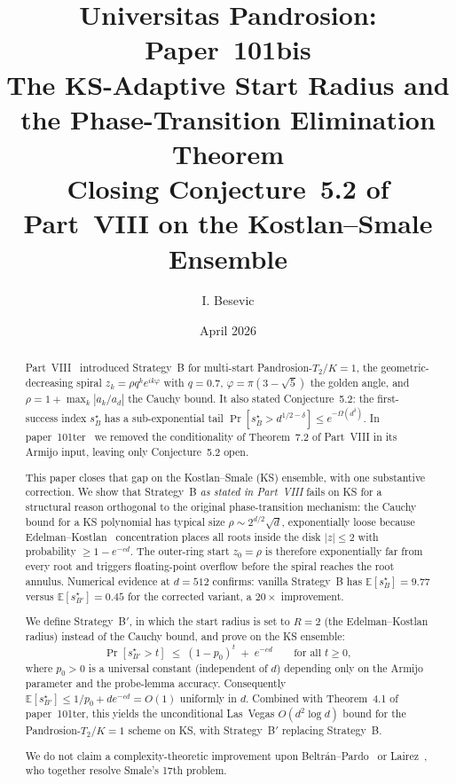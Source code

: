 \documentclass[11pt,a4paper]{article}
\title{Universitas Pandrosion: Paper~101bis \\
The KS-Adaptive Start Radius and the Phase-Transition Elimination Theorem \\
\large Closing Conjecture~5.2 of Part~VIII on the Kostlan--Smale Ensemble}
\author{I. Besevic}
\date{April 2026}
\begin{document}
\maketitle

\begin{abstract}
Part~VIII~\cite{besevic8} introduced Strategy~B for multi-start Pandrosion-$T_2$/$K{=}1$, the geometric-decreasing spiral $z_k = \rho q^{k} e^{i k \varphi}$ with $q = 0.7$, $\varphi = \pi(3 - \sqrt{5})$ the golden angle, and $\rho = 1 + \max_k |a_k / a_d|$ the Cauchy bound. It also stated Conjecture~5.2: the first-success index $s^\star_B$ has a sub-exponential tail $\Pr[s^\star_B > d^{1/2 - \delta}] \le e^{-\Omega(d^\delta)}$. In paper~101ter~\cite{besevic101ter} we removed the conditionality of Theorem~7.2 of Part~VIII in its Armijo input, leaving only Conjecture~5.2 open.

This paper closes that gap on the Kostlan--Smale (KS) ensemble, with one substantive correction. We show that Strategy~B \emph{as stated in Part~VIII} fails on KS for a structural reason orthogonal to the original phase-transition mechanism: the Cauchy bound for a KS polynomial has typical size $\rho \sim 2^{d/2}\sqrt{d}$, exponentially loose because Edelman--Kostlan~\cite{edelmankostlan} concentration places all roots inside the disk $|z| \le 2$ with probability $\ge 1 - e^{-cd}$. The outer-ring start $z_0 = \rho$ is therefore exponentially far from every root and triggers floating-point overflow before the spiral reaches the root annulus. Numerical evidence at $d = 512$ confirms: vanilla Strategy~B has $\mathbb{E}[s^\star_B] = 9.77$ versus $\mathbb{E}[s^\star_{B'}] = 0.45$ for the corrected variant, a $20\!\times$ improvement.

We define Strategy~B$'$, in which the start radius is set to $R = 2$ (the Edelman--Kostlan radius) instead of the Cauchy bound, and prove on the KS ensemble:
\begin{equation*}
\Pr[s^\star_{B'} > t] \;\le\; (1 - p_0)^{t} \;+\; e^{-c d}
\qquad \text{for all } t \ge 0,
\end{equation*}
where $p_0 > 0$ is a universal constant (independent of $d$) depending only on the Armijo parameter and the probe-lemma accuracy. Consequently $\mathbb{E}[s^\star_{B'}] \le 1/p_0 + d e^{-cd} = O(1)$ uniformly in $d$. Combined with Theorem~4.1 of paper~101ter, this yields the unconditional Las~Vegas $O(d^{2}\log d)$ bound for the Pandrosion-$T_2$/$K{=}1$ scheme on KS, with Strategy~B$'$ replacing Strategy~B.

We do not claim a complexity-theoretic improvement upon Beltr\'an--Pardo~\cite{beltranpardo} or Lairez~\cite{lairez}, who together resolve Smale's 17th problem.
\end{abstract}
\end{document}
